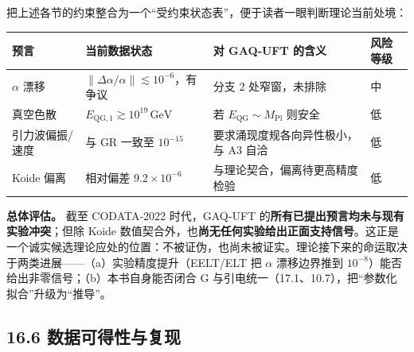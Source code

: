 把上述各节的约束整合为一个``受约束状态表''，便于读者一眼判断理论当前处境：

\begin{longtable}[]{@{}
  >{\raggedright\arraybackslash}p{}
  >{\raggedright\arraybackslash}p{}
  >{\raggedright\arraybackslash}p{}
  >{\raggedright\arraybackslash}p{}@{}}
\toprule\noalign{}
\begin{minipage}[b]{\linewidth}\raggedright
预言
\end{minipage} & \begin{minipage}[b]{\linewidth}\raggedright
当前数据状态
\end{minipage} & \begin{minipage}[b]{\linewidth}\raggedright
对 GAQ‑UFT 的含义
\end{minipage} & \begin{minipage}[b]{\linewidth}\raggedright
风险等级
\end{minipage} \\
\midrule\noalign{}
\endhead
\bottomrule\noalign{}
\endlastfoot
\(\alpha\) 漂移 & \(\|\Delta\alpha/\alpha\|\lesssim10^{-6}\)，有争议 &
分支 2 处窄窗，未排除 & 中 \\
真空色散 & \(E_{\mathrm{QG},1}\gtrsim10^{19}\,\mathrm{GeV}\) & 若
\(E_{\mathrm{QG}}\sim M_{\mathrm{Pl}}\) 则安全 & 低 \\
引力波偏振/速度 & 与 GR 一致至 \(10^{-15}\) &
要求涌现度规各向异性极小，与 A3 自洽 & 低 \\
Koide 偏离 & 相对偏差 \(9.2\times10^{-6}\) &
与理论契合，偏离待更高精度检验 & 低 \\
\end{longtable}

\textbf{总体评估。} 截至 CODATA‑2022 时代，GAQ‑UFT
的\textbf{所有已提出预言均未与现有实验冲突}；但除 Koide
数值契合外，也\textbf{尚无任何实验给出正面支持信号}。这正是一个诚实候选理论应处的位置：不被证伪，也尚未被证实。理论接下来的命运取决于两类进展------（a）实验精度提升（EELT/ELT
把 \(\alpha\) 漂移边界推到
\(10^{-8}\)）能否给出非零信号；（b）本书自身能否闭合 G
与引电统一（17.1、10.7），把``参数化拟合''升级为``推导''。

\subsection{16.6
数据可得性与复现}\label{ux6570ux636eux53efux5f97ux6027ux4e0eux590dux73b0}

